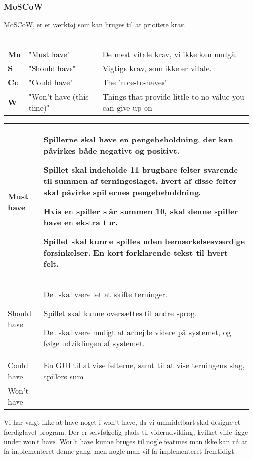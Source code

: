 \subsubsection{MoSCoW}
MoSCoW, er et værktøj som kan bruges til at prioitere krav. \\\\
\begin{tabular}{lll}
    \textbf{Mo} &   
    "Must have"                 &
    De mest vitale krav, vi ikke kan undgå. \\

    \textbf{S}  &   
    "Should have"               & 
    Vigtige krav, som ikke er vitale. \\

    \textbf{Co} &   
    "Could have"                & 
    The 'nice-to-haves' \\

    \textbf{W}  &   
    "Won’t have (this time)"    & 
    Things that provide little to no value you can give up on \\
    
\end{tabular}

\begin{center}
    \begin{tabular}{ | l | p{13cm} |}
    \hline
    Must have & Spillerne skal have en pengebeholdning, der kan påvirkes både negativt og positivt.

    Spillet skal indeholde 11 brugbare felter svarende til summen af terningeslaget, hvert af disse felter skal påvirke spillernes pengebeholdning.

    Hvis en spiller slår summen 10, skal denne spiller have en ekstra tur.

    Spillet skal kunne spilles uden bemærkelsesværdige forsinkelser. En kort forklarende tekst til hvert felt. \\
    
    \hline
    Should have & Det skal være let at skifte terninger.

    Spillet skal kunne oversættes til andre sprog.

    Det skal være muligt at arbejde videre på systemet, og følge udviklingen af systemet. \\
    \hline
    Could have & En GUI til at vise felterne, samt til at vise terningens slag, spillers sum. \\
    \hline
    Won't have &  \\
    \hline
    \end{tabular}
\end{center}

\noindent
Vi har valgt ikke at have noget i won't have, da vi ummidelbart skal designe et færdiglavet program. Der er selvfølgelig plads til viderudvikling, hvilket ville ligge under won't have. Won't have kunne bruges til nogle features man ikke kan nå at få implementeret denne gang, men nogle man vil få implementeret fremtidigt.
